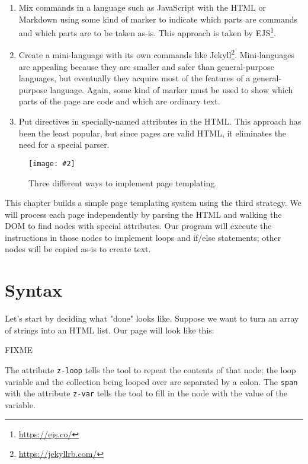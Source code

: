 \documentclass{scrbook}
\newcommand{\figpdf}[4]{\begin{figure}%
\centering%
\texttt{[image: \#2]}%
\caption{#3}%
\label{#1}%
\end{figure}}
\newcommand{\hreffoot}[2]{{#1}\footnote{\href{#2}{#2}}}
\begin{document}
\begin{enumerate}

\item 

Mix commands in a language such as JavaScript with the HTML or Markdown
    using some kind of marker to indicate which parts are commands
    and which parts are to be taken as-is.
    This approach is taken by \hreffoot{EJS}{https://ejs.co/}.



\item 

Create a mini-language with its own commands like \hreffoot{Jekyll}{https://jekyllrb.com/}.
    Mini-languages are appealing because they are smaller and safer than general-purpose languages,
    but eventually they acquire most of the features of a general-purpose language.
    Again, some kind of marker must be used to show
    which parts of the page are code and which are ordinary text.



\item 

Put directives in specially-named attributes in the HTML.
    This approach has been the least popular,
    but since pages are valid HTML,
    it eliminates the need for a special parser.



\end{enumerate}

\figpdf{templating-options}{./templating/options.pdf}{Three different ways to implement page templating.}{0.6}


This chapter builds a simple page templating system using the third strategy.
We will process each page independently by parsing the HTML
and walking the DOM to find nodes with special attributes.
Our program will execute the instructions in those nodes
to implement loops and if/else statements;
other nodes will be copied as-is to create text.

\section{Syntax}\label{templating-syntax}


Let's start by deciding what "done" looks like.
Suppose we want to turn an array of strings into an HTML list.
Our page will look like this:


FIXME


\noindent The attribute \texttt{z-loop} tells the tool to repeat the contents of that node;
the loop variable and the collection being looped over are separated by a colon.
The \texttt{span} with the attribute \texttt{z-var}
tells the tool to fill in the node with the value of the variable.
\end{document}

